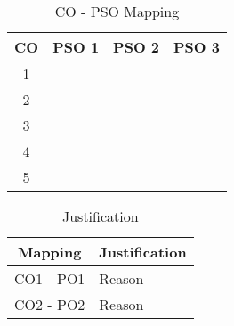 \begin{table}[htp]
\centering
\caption*{CO - PSO Mapping}
\begin{tabular}{|c|c|c|c|}
\hline
\textbf{CO} & \textbf{PSO 1} & \textbf{PSO 2} & \textbf{PSO 3} \\ \hline
1           &                &                &                \\ \hline
2           &                &                &                \\ \hline
3           &                &                &                \\ \hline
4           &                &                &                \\ \hline
5           &                &                &                \\ \hline
\end{tabular}
\end{table}


\begin{table}[htp]
\centering
\caption*{Justification}
\begin{tabular}{|c|l|}
\hline
\textbf{Mapping} & \multicolumn{1}{c|}{\textbf{Justification}} \\ \hline
CO1 - PO1        & Reason                                      \\ \hline
CO2 - PO2        & Reason                                      \\ \hline
\end{tabular}
\end{table}
